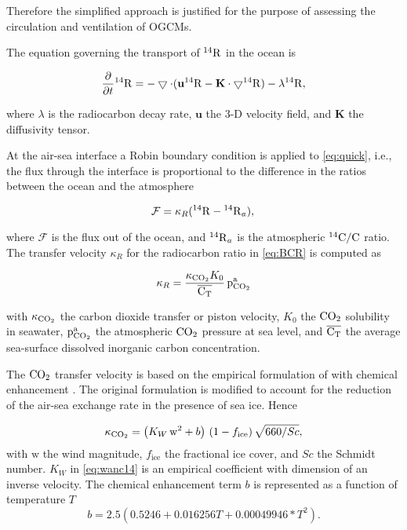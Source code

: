 \documentclass[../main/TOP_manual]{subfiles}
\begin{document}
Therefore the simplified approach is justified for the purpose of assessing the circulation and ventilation of OGCMs.

The equation governing the transport of $\mathrm{^{14}{R}}$  in the ocean is

\begin{equation}
\frac{\partial}{\partial t} {\mathrm{^{14}{R}}} =  - \bigtriangledown \cdot ( \mathbf{u} \mathrm{^{14}{R}} - \mathbf{K} \cdot \bigtriangledown \mathrm{^{14}{R}} )  - \lambda \mathrm{^{14}{R}}, \label{eq:quick}
\end{equation}

where $\lambda$ is the radiocarbon decay rate, ${\mathbf{u}}$ the 3-D velocity field, and $\mathbf{K}$ the diffusivity tensor.

At the air-sea interface a Robin boundary condition \citep{haine_2006} is applied to \autoref{eq:quick}, i.e., the flux
through the interface is proportional to the difference in the ratios between
the ocean and the atmosphere

\begin{equation}
\mathcal{\!F} =  \kappa_{R}  (\mathrm{^{14}{R}}  - \mathrm{^{14}{R}}_{a} ), \label{eq:BCR}
\end{equation}

where $\mathcal{\!F}$ is the flux out of the ocean, and $\mathrm{^{14}{R}}_{a}$ is the atmospheric $\mathrm{^{14}C}/\mathrm{C}$ ratio.
The transfer velocity $ \kappa_{R} $ for the radiocarbon ratio in \autoref{eq:BCR} is computed as

\begin{equation}
 \kappa_{R} =  \frac{\kappa_{\mathrm{CO_2}} K_0}{\overline{\mathrm{C_T}}} \, \mathrm{p^a_{CO_2}}   \label{eq:Rspeed}
\end{equation}

with $\kappa_{\mathrm{CO_2}}$ the carbon dioxide transfer or piston velocity, $K_0$ the $\mathrm{CO_2}$ solubility in seawater, $\mathrm{p^a_{CO_2}}$ the atmospheric $\mathrm{CO_2}$ pressure at sea level, and $\overline{\mathrm{C_T}}$ the average sea-surface dissolved inorganic carbon concentration.

The $\mathrm{CO_2}$ transfer velocity is based on the empirical formulation of \cite{wanninkhof_1992} with chemical enhancement \citep{wanninkhof_1996,wanninkhof_2014}.
The original formulation is modified to account for the reduction of the  air-sea exchange rate in the presence of sea ice.
Hence

\begin{equation}
\kappa_{\mathrm{CO_2}}=\left( K_W\,\mathrm{w}^2 + b  \right)\, (1-f_\mathrm{ice})\,\sqrt{660/Sc}, \label{eq:wanc14}
\end{equation}
with $\mathrm{w}$ the wind magnitude, $f_\mathrm{ice}$ the fractional ice cover, and $Sc$ the Schmidt number.
$K_W$ in \autoref{eq:wanc14} is an empirical coefficient with dimension of an inverse velocity.
The chemical enhancement term $b$ is represented as a function of temperature $T$ \citep{wanninkhof_1992}
\begin{equation}
b=2.5 ( 0.5246 + 0.016256 T+ 0.00049946  * T^2 ). \label{eq:wanchem}
\end{equation}
\end{document}
